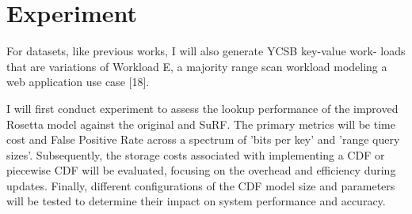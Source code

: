 \documentclass[12pt, letterpaper]{article}
\begin{document}
\section{Experiment}
For datasets, like previous works, I will also generate YCSB\cite{cooper2010benchmarking} key-value work- loads that are variations of Workload E, a majority range scan workload modeling a web application use case [18].  

I will first conduct experiment to assess the lookup performance of the improved Rosetta model against the original and SuRF. The primary metrics will be time cost and False Positive Rate across a spectrum of 'bits per key' and 'range query sizes'. Subsequently, the storage costs associated with implementing a CDF or piecewise CDF will be evaluated, focusing on the overhead and efficiency during updates. Finally, different configurations of the CDF model size and parameters will be tested to determine their impact on system performance and accuracy. \\




% 
\begin{refcontext}[sorting = none]
\printbibliography
\end{refcontext}
\end{document}
